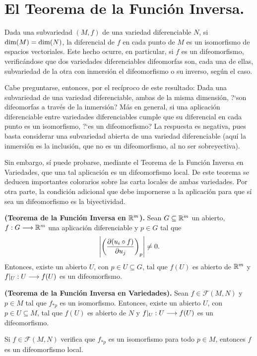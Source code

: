 \documentclass[Cursovd_portada.tex]{subfiles}
\begin{document}
\section{El Teorema de la Función Inversa.}
\hs Dada una subvariedad $(M,f)$ de una variedad diferenciable
$N$, si ${\rm dim}(M)={\rm dim}(N)$, la diferencial de $f$ en cada
punto de $M$ es un isomorfismo de espacios vectoriales. Este hecho
ocurre, en particular, si $f$ es un difeomorfismo,
verificándose que dos variedades diferenciables difeomorfas
son, cada una de ellas, subvariedad de la otra con inmersión
el difeomorfismo o su inverso, según el caso.
\par Cabe preguntarse, entonces, por el recíproco de este resultado: Dada una subvariedad de una variedad
diferenciable, ambas de la misma dimensión, ?`son difeomorfas
a través de la inmersión? Más en general, si una
aplicación diferenciable entre variedades diferenciables
cumple que su diferencial en cada punto es un isomorfismo, ?`es un
difeomorfismo? La respuesta es negativa, pues basta considerar una
subvariedad abierta de una variedad diferenciable (aquí la
inmersión es la inclusión, que no es un difeomorfismo, al
no ser sobreyectiva).
\par Sin embargo, sí puede probarse, mediante el Teorema de la Función Inversa en Variedades, que una tal aplicación
es un difeomorfismo local. De este teorema se deducen importantes
colorarios sobre las carta locales de ambas variedades. Por otra
parte, la condición adicional que debe impornerse a la
aplicación para que sí sea un difeomorfismo es la
biyectividad.
\begin{teorema}
{\bf (Teorema de la Función Inversa en $\mathbb{R}^m$).} Sean
$G\subseteq\mathbb{R}^m$ un abierto, $f:G\longrightarrow\mathbb{R}^m$ una aplicación
diferenciable y $p\in G$ tal que
$$\left|\left(\displaystyle{\frac{\partial (u_i\circ f)}{\partial u_j}}\right)_{p}\right|\neq 0.$$
Entonces, existe un abierto $U$, con $p\in U\subseteq G$, tal que
$f(U)$ es abierto de $\mathbb{R}^m$ y $f|_U:U\longrightarrow f(U)$ es un
difeomorfismo.
\end{teorema}
\begin{teorema}
{\bf (Teorema de la Función Inversa en Variedades).} Sean
$f\in\mathcal{F}(M,N)$ y $p\in M$ tal que $f_{*p}$ es un
isomorfismo. Entonces, existe un abierto $U$, con $p\in U\subseteq
M$, tal que $f(U)$ es abierto de $N$ y $f|_U:U\longrightarrow f(U)$ es un
difeomorfismo.
\end{teorema}
\begin{coro}
Si $f\in\mathcal{F}(M,N)$ verifica que $f_{*p}$ es un isomorfismo
para todo $p\in M$, entonces $f$ es un difeomorfismo local.
\end{coro}
\end{document}
